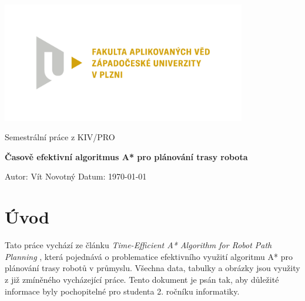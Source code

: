 \documentclass[10pt, a4paper]{article}
\begin{document}
\begin{titlepage}
    \includegraphics[width=0.80\textwidth]{images/fav.pdf}
    \begin{center}
        \vspace{2cm}

        \LARGE
        Semestrální práce z KIV/PRO

        \Huge
        \textbf{Časově efektivní algoritmus A* pro plánování trasy robota}

        \vspace{1cm}

        \vfill

        \vspace{0.5cm}

        \normalsize
        \raggedright
        Autor: Vít Novotný \hfill Datum: \today

        \vspace{0.2cm}

    \end{center}
\end{titlepage}

\thispagestyle{empty}
\pagebreak

\setcounter{page}{2}
\renewcommand{\cftsecleader}{\cftdotfill{\cftdotsep}}
\renewcommand{\cftsubsecleader}{\cftdotfill{\cftdotsep}}
\renewcommand{\cftsubsubsecleader}{\cftdotfill{\cftdotsep}}

\tableofcontents
\pagebreak


\section{Úvod}

Tato práce vychází ze článku \textit{Time-Efficient A* Algorithm for Robot Path Planning} \cite{MainWork}, která pojednává o problematice efektivního využití algoritmu A* pro plánování trasy robotů v průmyslu. Všechna data, tabulky a obrázky jsou využity z již zmíněného vycházející práce. Tento dokument je psán tak, aby důležité informace byly pochopitelné pro studenta 2. ročníku informatiky.
\end{document}
